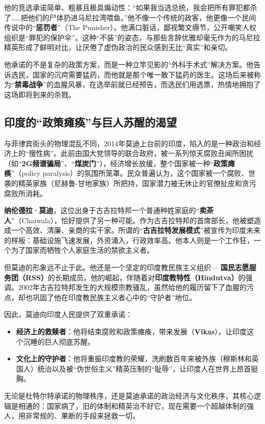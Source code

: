 他的竞选承诺简单、粗暴且极具煽动性：``如果我当选总统，我会把所有罪犯都杀了…{}…{}把他们的尸体扔进马尼拉湾喂鱼。''他不像一个传统的政客，他更像一个民间传说中的``\textbf{惩罚者}''（The Punisher）。他满口脏话，鄙视繁文缛节，公开嘲笑人权组织是``罪犯的保护伞''。这种``不装''的姿态，与那些言辞优雅却毫无作为的马尼拉精英形成了鲜明对比，让厌倦了虚伪政治的民众感到无比``真实''和亲切。

他承诺的不是复杂的政策方案，而是一种立竿见影的``外科手术式''解决方案。他告诉选民，国家的沉疴需要猛药，而他就是那个唯一敢下猛药的医生。这场后来被称为``\textbf{禁毒战争}''的血腥风暴，在选举前就已经预告，而选民们用选票，热情地拥抱了这场即将到来的杀戮。

\subsection{印度的``政策瘫痪''与巨人苏醒的渴望}

与菲律宾街头的物理混乱不同，2014年莫迪上台前的印度，陷入的是一种政治和经济上的``慢性病''。此前由国大党领导的联合政府，被一系列惊天腐败丑闻所困扰（如``\textbf{2G频谱骗局}''、``\textbf{煤炭门}''），经济增长放缓，整个国家被一种``\textbf{政策瘫痪}''（policy paralysis）的氛围所笼罩。民众普遍认为，这个国家被一个腐败、世袭的精英家族（尼赫鲁-甘地家族）所把持，国家潜力被无休止的官僚扯皮和贪污腐败所消耗。

\textbf{纳伦德拉·莫迪}，这位出身于古吉拉特邦一个普通种姓家庭的``\textbf{卖茶人}''（Chaiwala），恰好提供了另一种可能。作为古吉拉特邦的首席部长，他被塑造成一个高效、清廉、亲商的实干家。所谓的``\textbf{古吉拉特发展模式}''被宣传为印度未来的样板：基础设施飞速发展，外资涌入，行政效率高。他本人则是一个工作狂，一个为了国家而牺牲个人家庭生活的禁欲主义者。

但莫迪的形象远不止于此。他还是一个坚定的印度教民族主义组织--- \textbf{国民志愿服务团（RSS）}的长期成员。他的崛起，伴随着对\textbf{印度教特性（Hindutva）}的强调。2002年古吉拉特邦发生的大规模宗教骚乱，虽然给他的履历留下了血腥的污点，却也巩固了他在印度教民族主义者心中的``守护者''地位。

因此，莫迪向印度人民提供了双重承诺：
\begin{itemize}
\item \textbf{经济上的救赎者}：他将结束腐败和政策瘫痪，带来发展（\textbf{Vikas}），让印度这个沉睡的巨人彻底苏醒。
\item \textbf{文化上的守护者}：他将重振印度教的荣耀，洗刷数百年来被外族（穆斯林和英国人）统治以及被``伪世俗主义''精英压制的``耻辱''，让印度人在世界上昂首挺胸。
\end{itemize}
无论是杜特尔特承诺的物理秩序，还是莫迪承诺的政治经济与文化秩序，其核心逻辑是相通的：国家病了，旧的体制和精英治不好它，现在需要一个超越体制的强人，用非常规的、果断的手段来拯救一切。

